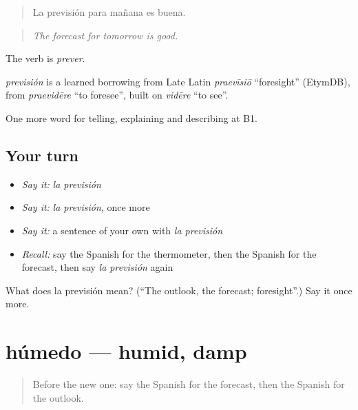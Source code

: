 \begin{quote}
La previsión para mañana es buena.
\end{quote}

\begin{quote}
\emph{The forecast for tomorrow is good.}
\end{quote}

The verb is \emph{prever}.

\begin{cousinweb}
\emph{previsión} is a learned borrowing from Late Latin \emph{praevīsiō} \textquotedblleft{}foresight\textquotedblright{} (EtymDB), from \emph{praevidēre} \textquotedblleft{}to foresee\textquotedblright{}, built on \emph{vidēre} \textquotedblleft{}to see\textquotedblright{}.
\end{cousinweb}

\begin{grammarlens}[title={What you've built}]
One more word for telling, explaining and describing at B1.
\end{grammarlens}

\subsection*{Your turn}
\begin{itemize}
\raggedright
  \item \emph{Say it:} \emph{la previsión}
  \item \emph{Say it:} \emph{la previsión}, once more
  \item \emph{Say it:} a sentence of your own with \emph{la previsión}
  \item \emph{Recall:} say the Spanish for the thermometer, then the Spanish for the forecast, then say \emph{la previsión} again
\end{itemize}

\begin{tcolorbox}[breakable,colback=teal!4,colframe=teal!35!black,title={Before you move on}]
What does la previsión mean? (\textquotedblleft{}The outlook, the forecast; foresight\textquotedblright{}.) Say it once more.
\end{tcolorbox}
\section[húmedo]{húmedo — humid, damp}

\label{lesson:ES-C696-humedo}



\begin{quote}
Before the new one: say the Spanish for the forecast, then the Spanish for the outlook.
\end{quote}

